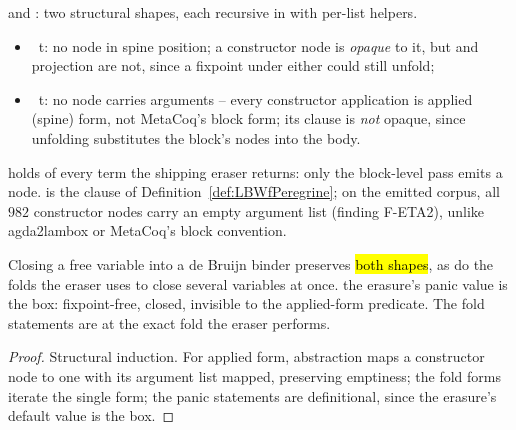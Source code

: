 \begin{definition}
\label{def:NoFix}
\leanok
{}
  and : two structural shapes, each recursive in 
with per-list helpers.
\begin{itemize}
\item {}\ t: no  node in spine position; a constructor node is \emph{opaque} to it,
but  and projection are not, since a fixpoint under either could still unfold;
\item {}\ t: no  node carries arguments -- every constructor application is
applied (spine) form, not MetaCoq's block form; its  clause is \emph{not} opaque, since
unfolding substitutes the block's nodes into the body.
\end{itemize}
\end{definition}

\begin{remark}
  holds of every term the shipping eraser returns: only the block-level pass
emits a  node.  is the  clause of
Definition~\ref{def:LBWfPeregrine}; on the emitted corpus, all $982$ constructor nodes carry an empty
argument list (finding F-ETA2), unlike agda2lambox or MetaCoq's block convention.
\end{remark}

\begin{lemma}
\label{lem:noFix_toBvar}
\leanok
{}
 Closing a free variable into a de Bruijn binder preserves \hl{both shapes}, as do the
folds the eraser uses to close several variables at once.
 the erasure's panic value is the box: fixpoint-free, closed, invisible to the applied-form
predicate. The fold statements are at the exact fold the eraser performs.
\end{lemma}
\begin{proof}
\leanok
{}
 Structural induction. For applied form, abstraction maps a constructor node to one with its
argument list mapped, preserving emptiness; the fold forms iterate the single form; the panic statements
are definitional, since the erasure's default value is the box.
\end{proof}

